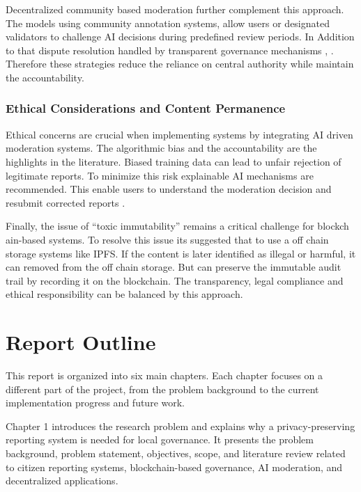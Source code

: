 Decentralized community based moderation further complement this approach. The models using community annotation systems, allow users or designated validators to challenge AI decisions during predefined review periods. In Addition to that dispute resolution handled by transparent governance mechanisms \cite{dzone2026blockchainai}, \cite{kae2025research}. Therefore these strategies reduce the reliance on central authority while maintain the accountability.

\subsubsection{Ethical Considerations and Content Permanence}

Ethical concerns are crucial when implementing systems by integrating AI driven moderation systems. The algorithmic bias and the accountability are the highlights in the literature. Biased training data can lead to unfair rejection of legitimate reports\cite{chase2024ai}. To minimize this risk explainable AI mechanisms are recommended. This enable users to understand the moderation decision and resubmit corrected reports \cite{mounika2024integrated}. 

Finally, the issue of “toxic immutability” remains a critical challenge for blockch\\ain-based systems. To resolve this issue its suggested that to use a off chain storage systems like IPFS. If the content is later identified as illegal or harmful, it can removed from the off chain storage. But can preserve the immutable audit trail by recording it on the blockchain\cite{prasad2024blockchain}. The transparency, legal compliance and ethical responsibility can be balanced by this approach.


\section{Report Outline}

This report is organized into six main chapters. Each chapter focuses on a different part of the project, from the problem background to the current implementation progress and future work.

Chapter 1 introduces the research problem and explains why a privacy-preserving reporting system is needed for local governance. It presents the problem background, problem statement, objectives, scope, and literature review related to citizen reporting systems, blockchain-based governance, AI moderation, and decentralized applications.

